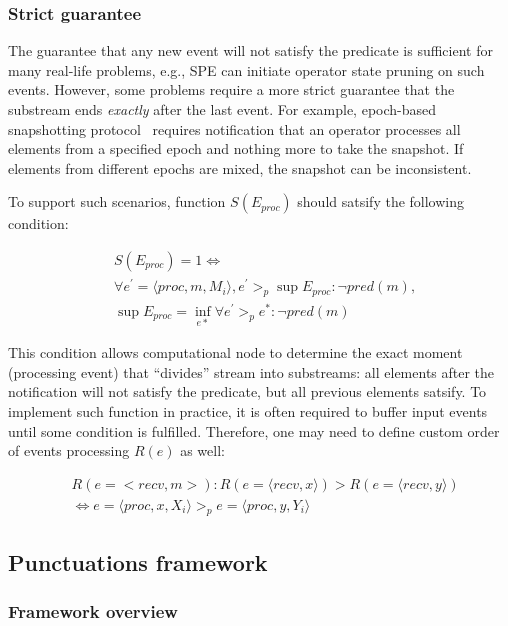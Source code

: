\subsubsection{Strict guarantee}

The guarantee that any new event will not satisfy the predicate is sufficient for many real-life problems, e.g., SPE can initiate operator state pruning on such events. However, some problems require a more strict guarantee that the substream ends {\em exactly} after the last event. For example, epoch-based snapshotting protocol~\cite{2015arXiv150608603C, jacques2016consistent} requires notification that an operator processes all elements from a specified epoch and nothing more to take the snapshot. If elements from different epochs are mixed, the snapshot can be inconsistent.

To support such scenarios, function $S(E_{proc})$ should satsify the following condition:

\begin{align*}
& S(E_{proc}) = 1  \Longleftrightarrow \\
& \forall e^{'} = \langle proc,m,M_i\rangle, e^{'} >_p \sup E_{proc} : \neg pred(m), \\
& \sup E_{proc} = \inf_{e*} \forall e^{'} >_p e^{*} : \neg pred(m) 
\end{align*}

This condition allows computational node to determine the exact moment (processing event) that ``divides'' stream into substreams: all elements after the notification will not satisfy the predicate, but all previous elements satsify. To implement such function in practice, it is often required to buffer input events until some condition is fulfilled. Therefore, one may need to define custom order of events processing $R(e)$ as well:

\begin{align*}
& R(e=<recv,m>): R(e=\langle recv, x\rangle) > R(e=\langle recv, y\rangle) \\
& \Longleftrightarrow e=\langle proc,x,X_i\rangle >_p e=\langle proc,y,Y_i\rangle
\end{align*}

\subsection{Punctuations framework}

\subsubsection{Framework overview}

